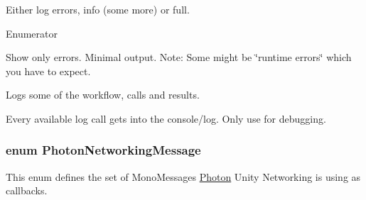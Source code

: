 Either log errors, info (some more) or full.\begin{Desc}
\item[Enumerator]\par
\begin{description}
\item[{\em 
Errors\+Only\hypertarget{group__public_api_ggaf0468f6a0c8ab8caec09678e6dc6f3d5ae0a1284706116eec7a83a489235a9ef8}{}\label{group__public_api_ggaf0468f6a0c8ab8caec09678e6dc6f3d5ae0a1284706116eec7a83a489235a9ef8}
}]Show only errors. Minimal output. Note\+: Some might be \char`\"{}runtime errors\char`\"{} which you have to expect.\item[{\em 
Informational\hypertarget{group__public_api_ggaf0468f6a0c8ab8caec09678e6dc6f3d5a5391f9a882a54c787b206138ed6d28b0}{}\label{group__public_api_ggaf0468f6a0c8ab8caec09678e6dc6f3d5a5391f9a882a54c787b206138ed6d28b0}
}]Logs some of the workflow, calls and results.\item[{\em 
Full\hypertarget{group__public_api_ggaf0468f6a0c8ab8caec09678e6dc6f3d5abbd47109890259c0127154db1af26c75}{}\label{group__public_api_ggaf0468f6a0c8ab8caec09678e6dc6f3d5abbd47109890259c0127154db1af26c75}
}]Every available log call gets into the console/log. Only use for debugging.\end{description}
\end{Desc}
\subsubsection[{\texorpdfstring{Photon\+Networking\+Message}{PhotonNetworkingMessage}}]{\setlength{\rightskip}{0pt plus 5cm}enum {\bf Photon\+Networking\+Message}\hspace{0.3cm}{\ttfamily [strong]}}\hypertarget{group__public_api_gaf30bbea51cc8c4b1ddc239d1c5c1468f}{}\label{group__public_api_gaf30bbea51cc8c4b1ddc239d1c5c1468f}


This enum defines the set of Mono\+Messages \hyperlink{namespace_photon}{Photon} Unity Networking is using as callbacks. 

